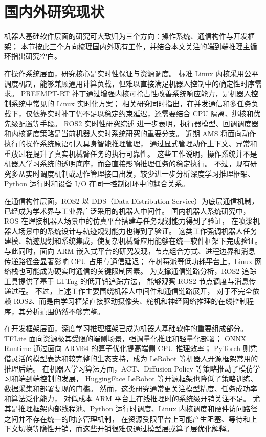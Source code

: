 \section{国内外研究现状}\label{sec:related-work}

机器人基础软件层面的研究可大致归为三个方向：操作系统、通信构件与开发框架；
本节按此三个方向梳理国内外现有工作，并结合本文关注的端到端推理主循环指出研究空白。

在操作系统层面，研究核心是实时性保证与资源调度。
标准 Linux 内核采用公平调度机制，能够兼顾通用计算负载，但难以直接满足机器人控制中的确定性时序需求。
PREEMPT-RT 补丁通过增强内核可抢占性改善系统响应能力，是机器人控制系统中常见的 Linux 实时化方案\cite{rtlinux}；
相关研究同时指出，在并发通信和多任务负载下，仅依靠实时补丁仍不足以稳定约束延迟，还需要结合 CPU 隔离、绑核和优先级配置等手段。
ROS2 实时性研究综述\cite{ros2rtsurvey} 进一步表明，执行器模型、回调调度器和内核调度策略是当前机器人实时系统研究的重要分支。
近期 AMS\cite{ams} 将面向动作执行的操作系统原语引入具身智能推理管理，
通过显式管理动作上下文、异常和重放过程提升了真实机械臂任务的执行可靠性。
这些工作说明，操作系统并不是机器人学习系统的透明底座，而会直接影响推理任务的稳定执行。
不过，现有研究多从实时调度机制或动作管理接口出发，较少进一步分析深度学习推理框架、Python 运行时和设备 I/O 在同一控制闭环中的耦合关系。

在通信构件层面，ROS2\cite{ros2} 以 DDS（Data Distribution Service）为底层通信机制，
已经成为学术界与工业界广泛采用的机器人中间件。
国内机器人系统研究中，ROS 在焊接机器人场景中的仿真平台搭建与任务规划能力得到了验证\cite{houguowei2023weldingrobot}，
在喷浆机器人场景中的系统设计与轨迹规划能力也得到了验证\cite{linxuebin2020shotcreterobot}。
这类工作强调机器人任务建模、轨迹规划和系统集成，使复杂机械臂应用能够在统一软件框架下完成验证。
与此同时，面向 ARM 嵌入式平台的研究发现，节点组合方式、进程边界和消息传递路径会显著影响 CPU 占用与通信延迟\cite{ros2composition}；
在树莓派等低功耗平台上，Linux 网络栈也可能成为硬实时通信的关键限制因素\cite{ros2ddsrpi}。
为支撑通信链路分析，ROS2 追踪工具提供了基于 LTTng 的低开销追踪方法\cite{ros2tracing}，
能够观察 ROS2 节点调度与消息传递过程。
不过，上述工作主要围绕机器人中间件和通信链路展开，
对于不完全依赖 ROS2、而是由学习框架直接驱动摄像头、舵机和神经网络推理的在线控制程序，其分析范围仍然不够完整。

在开发框架层面，深度学习推理框架已成为机器人基础软件的重要组成部分。
TFLite\cite{tflite} 面向资源极其受限的端侧场景，强调量化推理和轻量化部署；
ONNX Runtime\cite{onnxruntime} 通过面向 ARM64 的算子优化提高端侧 CPU 推理效率；
PyTorch\cite{pytorch} 则凭借灵活的模型表达和较完整的生态支持，成为 LeRobot 等机器人开源框架常用的推理后端。
在机器人学习算法方面，ACT、Diffusion Policy 等策略推动了模仿学习和端到端控制的发展，
HuggingFace LeRobot\cite{lerobot} 等开源框架也降低了策略训练、数据采集和部署复现的门槛。
然而，这类研究通常更关注模型精度、任务成功率和算法泛化能力，
对低成本 ARM 平台上在线推理时的系统级开销关注不足。
尤其是推理框架内部线程池、Python 运行时调度、Linux 内核调度和硬件访问路径之间并不存在统一的时序管理机制，
在资源受限平台上可能产生阻塞、等待和上下文切换等隐性开销，而这些开销很难仅通过模型层或算子层优化解释。

